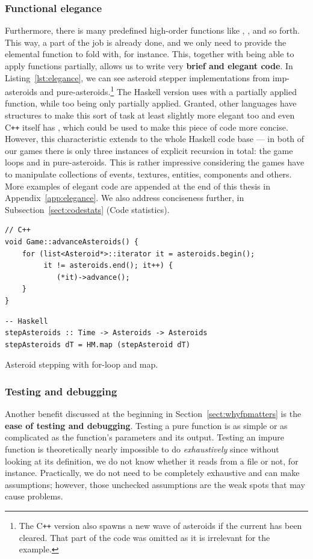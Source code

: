 \documentclass[
  digital, %
  color,   %
  table,   %
  oneside, %
  lof,     %
  lot,     %
]{fithesis3}
\newcommand{\cpp}{C\nolinebreak\texttt{+}\nolinebreak\texttt{+}}
\begin{document}
{\subsubsection{Functional elegance}
Furthermore, there is many predefined high-order functions like
, ,  and so forth. This way, a part of the
job is already done, and we only need to provide the elemental function to fold with, for instance.
This, together with being able to apply functions partially, allows us to write
very \textbf{brief and elegant code}. In Listing~\ref{lst:elegance},
we can see asteroid stepper implementations
from imp-asteroids and pure-asteroids.\footnote{
The \cpp{} version also spawns a new wave of asteroids if the current has been cleared.
That part of the code was omitted as it is irrelevant for the example.
} The Haskell version uses  with a partially applied function,
while too being only partially applied. Granted, other languages have structures
to make this sort of task at least slightly more elegant too
and even \cpp{} itself has ,
which could be used to make this piece of code more concise. However, this characteristic extends
to the whole Haskell code base --- in both of our games there is only three instances
of explicit recursion in total: the game loops and  in pure-asteroids.
This is rather impressive considering the games have to manipulate collections of events,
textures, entities, components and others. More examples of elegant code are appended at the end
of this thesis in Appendix~\ref{app:elegance}.
We also address conciseness further, in Subsection~\ref{sect:codestats} (Code statistics).
\begin{listing}[H]
\begin{verbatim}
// C++
void Game::advanceAsteroids() {
    for (list<Asteroid*>::iterator it = asteroids.begin();
         it != asteroids.end(); it++) {
            (*it)->advance();
    }
}
\end{verbatim}

\begin{verbatim}
-- Haskell
stepAsteroids :: Time -> Asteroids -> Asteroids
stepAsteroids dT = HM.map (stepAsteroid dT)
\end{verbatim}
\caption{Asteroid stepping with for-loop and map.}
\label{lst:elegance}
\end{listing}


\subsubsection{Testing and debugging}
Another benefit discussed at the beginning in Section~\ref{sect:whyfpmatters}
is the \textbf{ease of testing and debugging}. Testing a pure function is as simple or as complicated
as the function's parameters and its output. Testing an impure function is
theoretically nearly impossible to do \emph{exhaustively} since without looking at
its definition, we do not know whether it reads from a file or not, for instance.
Practically, we do not need to be completely exhaustive and can make assumptions;
however, those unchecked assumptions are the weak spots that may cause problems.

}
\end{document}
